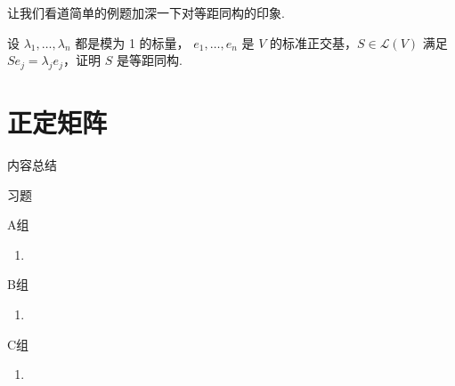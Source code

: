 让我们看道简单的例题加深一下对等距同构的印象. 
\begin{example}
    设 $ \lambda_1, \ldots , \lambda_n $ 都是模为 1 的标量，
    $ e_1, \ldots , e_n $ 是 $ V $ 的标准正交基，$ S \in \mathcal{L}(V) $ 
    满足 $ Se_j = \lambda_je_j $，证明 $ S $ 是等距同构. 
\end{example}

\section{正定矩阵}

\vspace{2ex}
\centerline{\heiti \Large 内容总结}

\vspace{2ex}

\centerline{\heiti \Large 习题}
\vspace{2ex}
{\kaishu }
\begin{flushright}
    \kaishu

\end{flushright}
\centerline{\heiti A组}
\begin{enumerate}
    \item
\end{enumerate}
\centerline{\heiti B组}
\begin{enumerate}
    \item
\end{enumerate}
\centerline{\heiti C组}
\begin{enumerate}
    \item
\end{enumerate}
